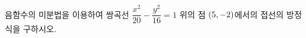 음함수의 미분법을 이용하여 쌍곡선 $\dfrac{x^2}{20}-\dfrac{y^2}{16}=1$ 위의 점 $(5{,}\mkern3mu\mathopen{}-2)$에서의 접선의 방정식을 구하시오.

